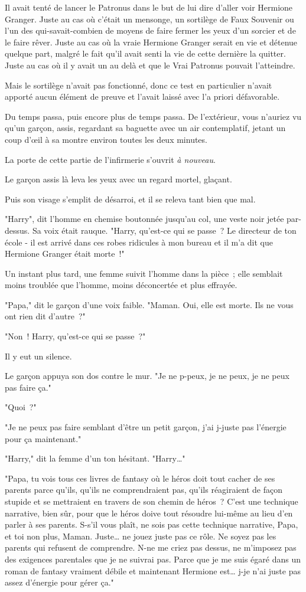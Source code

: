 Il avait tenté de lancer le Patronus dans le but de lui dire d'aller voir Hermione Granger. Juste au cas où c'était un mensonge, un sortilège de Faux Souvenir ou l'un des qui-savait-combien de moyens de faire fermer les yeux d'un sorcier et de le faire rêver. Juste au cas où la vraie Hermione Granger serait en vie et détenue quelque part, malgré le fait qu'il avait senti la vie de cette dernière la quitter. Juste au cas où il y avait un au delà et que le Vrai Patronus pouvait l'atteindre.

Mais le sortilège n'avait pas fonctionné, donc ce test en particulier n'avait apporté aucun élément de preuve et l'avait laissé avec l'a priori défavorable.

Du temps passa, puis encore plus de temps passa. De l'extérieur, vous n'auriez vu qu'un garçon, assis, regardant sa baguette avec un air contemplatif, jetant un coup d'œil à sa montre environ toutes les deux minutes.

La porte de cette partie de l'infirmerie s'ouvrit \emph{à nouveau}.

Le garçon assis là leva les yeux avec un regard mortel, glaçant.

Puis son visage s'emplit de désarroi, et il se releva tant bien que mal.

"Harry", dit l'homme en chemise boutonnée jusqu'au col, une veste noir jetée par-dessus. Sa voix était rauque. "Harry, qu'est-ce qui se passe~? Le directeur de ton école - il est arrivé dans ces robes ridicules à mon bureau et il m'a dit que Hermione Granger était morte~!"

Un instant plus tard, une femme suivit l'homme dans la pièce~; elle semblait moins troublée que l'homme, moins déconcertée et plus effrayée.

"Papa," dit le garçon d'une voix faible. "Maman. Oui, elle est morte. Ils ne vous ont rien dit d'autre~?"

"Non~! Harry, qu'est-ce qui se passe~?"

Il y eut un silence.

Le garçon appuya son dos contre le mur. "Je ne p-peux, je ne peux, je ne peux pas faire ça."

"Quoi~?"

"Je ne peux pas faire semblant d'être un petit garçon, j'ai j-juste pas l'énergie pour ça maintenant."

"Harry," dit la femme d'un ton hésitant. "Harry…"

"Papa, tu vois tous ces livres de fantasy où le héros doit tout cacher de ses parents parce qu'ils, qu'ils ne comprendraient pas, qu'ils réagiraient de façon stupide et se mettraient en travers de son chemin de héros~? C'est une technique narrative, bien sûr, pour que le héros doive tout résoudre lui-même au lieu d'en parler à ses parents. S-s'il vous plaît, ne sois pas cette technique narrative, Papa, et toi non plus, Maman. Juste… ne jouez juste pas ce rôle. Ne soyez pas les parents qui refusent de comprendre. N-ne me criez pas dessus, ne m'imposez pas des exigences parentales que je ne suivrai pas. Parce que je me suis égaré dans un roman de fantasy vraiment débile et maintenant Hermione est… j-je n'ai juste pas assez d'énergie pour gérer ça."

